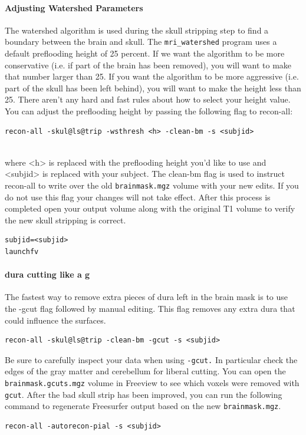 \documentclass[paper=a4, fontsize=11pt]{scrartcl} %
\numberwithin{equation}{section} %
\numberwithin{figure}{section} %
\numberwithin{table}{section} %
\begin{document}
\paragraph{Adjusting Watershed Parameters} The watershed algorithm is used during the skull stripping step to find a boundary between the brain and skull. The \texttt{mri\_watershed} program uses a default preflooding height of 25 percent. If we want the algorithm to be more conservative (i.e. if part of the brain has been removed), you will want to make that number larger than 25. If you want the algorithm to be more aggressive (i.e. part of the skull has been left behind), you will want to make the height less than 25. There aren't any hard and fast rules about how to select your height value. You can adjust the preflooding height by passing the following flag to recon-all:
~\\
\begin{lstlisting}[frame=single]
recon-all -skul@ls@trip -wsthresh <h> -clean-bm -s <subjid>
\end{lstlisting}
~\\
where <h> is replaced with the preflooding height you'd like to use and <subjid> is replaced with your subject. The clean-bm flag is used to instruct recon-all to write over the old \texttt{brainmask.mgz} volume with your new edits. If you do not use this flag your changes will not take effect.  After this process is completed open your output volume along with the original T1 volume to verify the new skull stripping is correct.
~\\
\begin{lstlisting}[frame=single]
subjid=<subjid>
launchfv 
\end{lstlisting}
\paragraph{dura cutting like a g} The fastest way to remove extra pieces of dura left in the brain mask is to use the -gcut flag followed by manual editing.  This flag removes any extra dura that could influence the surfaces.
~\\
\begin{lstlisting}[frame=single]
recon-all -skul@ls@trip -clean-bm -gcut -s <subjid>
\end{lstlisting}
Be sure to carefully inspect your data when using \texttt{-gcut.}  In particular check the edges of the gray matter and cerebellum for liberal cutting. You can open the \texttt{brainmask.gcuts.mgz} volume in Freeview to see which voxels were removed with \texttt{gcut}. After the bad skull strip has been improved, you can run the following command to regenerate Freesurfer output based on the new \texttt{brainmask.mgz}.
~\\
\begin{lstlisting}[frame=single]
recon-all -autorecon-pial -s <subjid>
\end{lstlisting}
\end{document}
